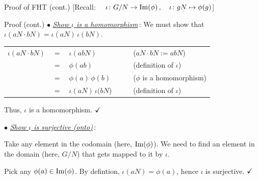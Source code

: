 \documentclass[8pt, handout]{beamer}
\newcommand{\Pause}{}      %
\begin{document}
\begin{frame}{Proof of FHT (cont.) [{\small Recall: 
    $\quad \iota\colon G/N\rightarrow\operatorname{Im}(\phi)\,,\quad\iota\colon 
    gN\mapsto\phi(g)$}]} 

  \begin{exampleblock}{Proof (cont.)}
    $\bullet$ \underline{\emph{Show $\iota$ is a homomorphism}}\,: \Pause We must
    show that $\iota(aN\cdot bN)=\iota(aN)\,\iota(bN)$. 
    
    \medskip\Pause
    
    \begin{center}\renewcommand{\arraystretch}{1.2}
      \begin{tabular}{rcllll}
        $\iota(aN\cdot bN)$ & $=$ & $\iota(abN)$ &&&($aN\cdot bN:=abN$)\Pause
        \\  
        & $=$ & $\phi(ab)$ &&& (definition of $\iota$) \Pause \\
        & $=$ & $\phi(a)\,\phi(b)$&&& ($\phi$ is a homomorphism)\Pause\\
        & $=$ & $\iota(aN)\,\iota(bN$) &&& (definition of $\iota$)
      \end{tabular}
    \end{center}
    
    \Pause Thus, $\iota$ is a homomorphism. $\hfill\checkmark$ 
    
    \bigskip\Pause
    
    \pause $\bullet$ \underline{\emph{Show $\iota$ is surjective (onto)}}\,:
    
    \medskip\Pause
    
    Take any element in the codomain (here, $\operatorname{Im}(\phi)$). \Pause We need to
    find an element in the domain (here, $G/N$) that gets mapped to it
    by $\iota$.
    
    \Pause\bigskip
    
    Pick any $\phi(a)\in\operatorname{Im}(\phi)$. \Pause By defintion, $\iota(aN)=\phi(a)$,
    hence $\iota$ is surjective. $\hfill\checkmark$ 
    
  \end{exampleblock}
  
\end{frame}

\end{document}

